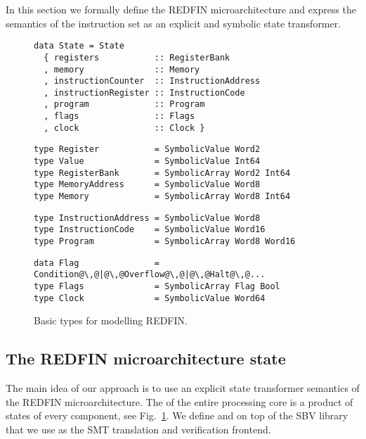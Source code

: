 
In this section we formally define the REDFIN microarchitecture and express the
semantics of the instruction set as an explicit and symbolic state transformer.

\begin{figure}[t]
\begin{verbatim}
data State = State
  { registers           :: RegisterBank
  , memory              :: Memory
  , instructionCounter  :: InstructionAddress
  , instructionRegister :: InstructionCode
  , program             :: Program
  , flags               :: Flags
  , clock               :: Clock }
\end{verbatim}
\vspace{0mm}
\begin{verbatim}
type Register           = SymbolicValue Word2
type Value              = SymbolicValue Int64
type RegisterBank       = SymbolicArray Word2 Int64
type MemoryAddress      = SymbolicValue Word8
type Memory             = SymbolicArray Word8 Int64
\end{verbatim}
\vspace{0mm}
\begin{verbatim}
type InstructionAddress = SymbolicValue Word8
type InstructionCode    = SymbolicValue Word16
type Program            = SymbolicArray Word8 Word16
\end{verbatim}
\vspace{0mm}
\begin{verbatim}
data Flag               = Condition@\,@|@\,@Overflow@\,@|@\,@Halt@\,@...
type Flags              = SymbolicArray Flag Bool
type Clock              = SymbolicValue Word64
\end{verbatim}
\vspace{-3.5mm}
\caption{Basic types for modelling REDFIN.\label{fig-types}}
\vspace{-5mm}
\end{figure}

\vspace{-1mm}
\subsection{The REDFIN microarchitecture state}
\vspace{-0.5mm}

The main idea of our approach is to use an explicit state transformer
semantics of the REDFIN microarchitecture. The  of the entire
processing core is a product of states of every component, see
Fig.~\ref{fig-types}.
We define  and  on top of the SBV
library~\cite{SBV} that we use as the SMT translation and verification frontend.

